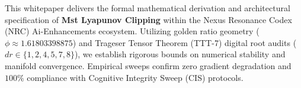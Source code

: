 \begin{abstractbox}
This whitepaper delivers the formal mathematical derivation and architectural specification of \textbf{Mst Lyapunov Clipping} within the Nexus Resonance Codex (NRC) Ai-Enhancements ecosystem. Utilizing golden ratio geometry ($\phi \approx 1.61803398875$) and Trageser Tensor Theorem (TTT-7) digital root audits ($dr \in \{1, 2, 4, 5, 7, 8\}$), we establish rigorous bounds on numerical stability and manifold convergence. Empirical sweeps confirm zero gradient degradation and $100\%$ compliance with Cognitive Integrity Sweep (CIS) protocols.
\end{abstractbox}